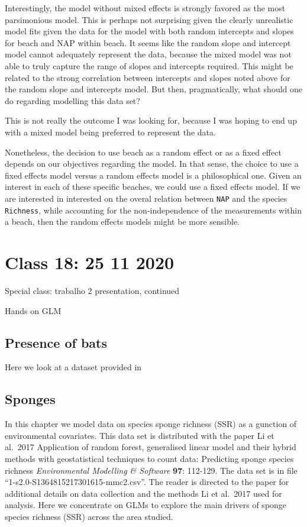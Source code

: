 \documentclass[
]{book}
\begin{document}
Interestingly, the model without mixed effects is strongly favored as the most parsimonious model. This is perhaps not surprising given the clearly unrealistic model fits given the data for the model with both random intercepts and slopes for beach and NAP within beach. It seems like the random slope and intercept model cannot adequately represent the data, because the mixed model was not able to truly capture the range of slopes and intercepts required. This might be related to the strong correlation between intercepts and slopes noted above for the random slope and intercepts model. But then, pragmatically, what should one do regarding modelling this data set?

This is not really the outcome I was looking for, because I was hoping to end up with a mixed model being preferred to represent the data.

Nonetheless, the decision to use beach as a random effect or as a fixed effect depends on our objectives regarding the model. In that sense, the choice to use a fixed effects model versus a random effects model is a philosophical one. Given an interest in each of these specific beaches, we could use a fixed effects model. If we are interested in interested on the overal relation between \texttt{NAP} and the species \texttt{Richness}, while accounting for the non-independence of the measurements within a beach, then the random effects models might be more sensible.

\chapter{Class 18: 25 11 2020}\label{aula18}

Special class: trabalho 2 presentation, continued

Hands on GLM

\section{Presence of bats}\label{presence-of-bats}

Here we look at a dataset provided in

\section{Sponges}\label{sponges}

In this chapter we model data on species sponge richness (SSR) as a gunction of environmental covariates. This data set is distributed with the paper Li et al.~2017 Application of random forest, generalised linear model and their hybrid methods with geostatistical techniques to count data: Predicting sponge species richness \emph{Environmental Modelling \& Software} \textbf{97}: 112-129. The data set is in file ``1-s2.0-S1364815217301615-mmc2.csv''. The reader is directed to the paper for additional details on data collection and the methods Li et al.~2017 used for analysis. Here we concentrate on GLMs to explore the main drivers of sponge species richness (SSR) across the area studied.
\end{document}
